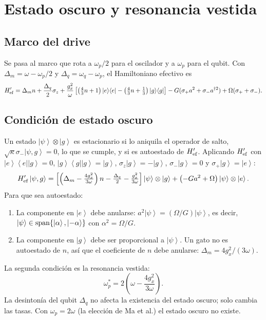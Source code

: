 \documentclass[11pt]{report}
\newcommand{\ket}[1]{\left|#1\right\rangle}
\newcommand{\bra}[1]{\left\langle#1\right|}
\newcommand{\spl}{\sigma_{+}}
\newcommand{\smi}{\sigma_{-}}
\newcommand{\Pe}{\ket{e}\!\bra{e}}
\newcommand{\Pg}{\ket{g}\!\bra{g}}
\begin{document}
\section{Estado oscuro y resonancia vestida}

\subsection{Marco del drive}

Se pasa al marco que rota a $\omega_{p}/2$ para el oscilador y a $\omega_{p}$ para el qubit. Con $\Delta_{m}=\omega-\omega_{p}/2$ y $\Delta_{q}=\omega_{q}-\omega_{p}$, el Hamiltoniano efectivo es
\begin{equation}
H_{\rm ef}'=\Delta_{m}n+\frac{\Delta_{q}}{2}\sigma_{z}+\frac{g_{x}^{2}}{\omega}\left[\left(\tfrac{4}{3}n+1\right)\Pe-\left(\tfrac{4}{3}n+\tfrac{1}{3}\right)\Pg\right]-G(\spl a^{2}+\smi a^{\dagger2})+\Omega(\spl+\smi).
\end{equation}

\subsection{Condici\'on de estado oscuro}

Un estado $\ket{\psi}\otimes\ket{g}$ es estacionario si lo aniquila el operador de salto, $\sqrt\kappa\smi\ket{\psi,g}=0$, lo que se cumple, y si es autoestado de $H_{\rm ef}'$. Aplicando $H_{\rm ef}'$ con $\Pe\ket{g}=0$, $\Pg\ket{g}=\ket{g}$, $\sigma_{z}\ket{g}=-\ket{g}$, $\smi\ket{g}=0$ y $\spl\ket{g}=\ket{e}$:
\begin{equation}
H_{\rm ef}'\ket{\psi,g}=\left[\left(\Delta_{m}-\tfrac{4g_{x}^{2}}{3\omega}\right)n-\tfrac{\Delta_{q}}{2}-\tfrac{g_{x}^{2}}{3\omega}\right]\ket{\psi}\otimes\ket{g}+\left(-Ga^{2}+\Omega\right)\ket{\psi}\otimes\ket{e}.
\end{equation}
Para que sea autoestado:
\begin{enumerate}
\item La componente en $\ket{e}$ debe anularse: $a^{2}\ket{\psi}=(\Omega/G)\ket{\psi}$, es decir, $\ket{\psi}\in{\rm span}\{\ket{\alpha},\ket{-\alpha}\}$ con $\alpha^{2}=\Omega/G$.
\item La componente en $\ket{g}$ debe ser proporcional a $\ket{\psi}$. Un gato no es autoestado de $n$, as\'i que el coeficiente de $n$ debe anularse: $\Delta_{m}=4g_{x}^{2}/(3\omega)$.
\end{enumerate}
La segunda condici\'on es la resonancia vestida:
\begin{equation}
\boxed{\omega_{p}^{*}=2\left(\omega-\frac{4g_{x}^{2}}{3\omega}\right)}.
\end{equation}
La desinton\'ia del qubit $\Delta_{q}$ no afecta la existencia del estado oscuro; solo cambia las tasas. Con $\omega_{p}=2\omega$ (la elecci\'on de Ma et al.) el estado oscuro no existe.
\end{document}
